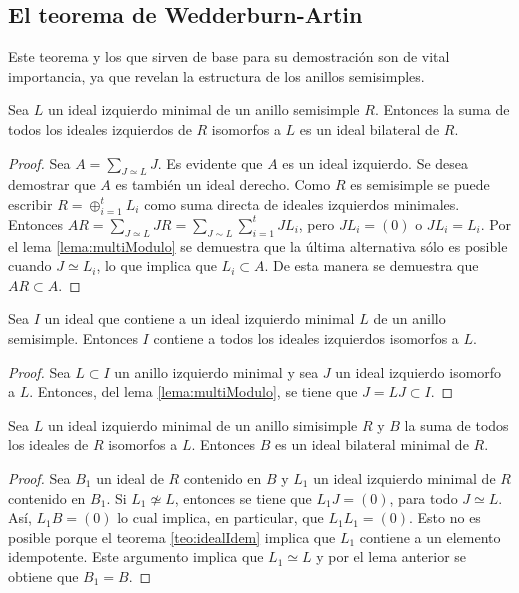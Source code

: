 \subsection{El teorema de Wedderburn-Artin}
Este teorema y los que sirven de base para su demostración son de vital importancia, ya que revelan la estructura de los anillos semisimples.
\begin{lema}
Sea $L$ un ideal izquierdo minimal de un anillo semisimple $R$. Entonces la suma de todos los ideales izquierdos de $R$ isomorfos a $L$ es un ideal bilateral de $R$.
\end{lema}
\begin{proof}
Sea $A = \sum_{J \simeq L}J$. Es evidente que $A$ es un ideal izquierdo. Se desea demostrar que $A$ es también un ideal derecho. Como $R$ es semisimple se puede escribir $R = \oplus_{i = 1}^tL_i$ como suma directa de ideales izquierdos minimales. Entonces $AR = \sum_{J \simeq L}JR = \sum_{J \sim L}\sum_{i=1}^{t}JL_i$, pero $JL_i = (0)$ o $JL_i = L_i$. Por el lema \ref{lema:multiModulo} se demuestra que la última alternativa sólo es posible cuando $J \simeq L_i$, lo que implica que $L_i \subset A$. De esta manera se demuestra que $AR \subset A$.
\end{proof}
\begin{lema}
Sea $I$ un ideal que contiene a un ideal izquierdo minimal $L$ de un anillo semisimple. Entonces $I$ contiene a todos los ideales izquierdos isomorfos a $L$.
\end{lema}
\begin{proof}
Sea $ L \subset I$ un anillo izquierdo minimal y sea $J$ un ideal izquierdo isomorfo a $L$. Entonces, del lema \ref{lema:multiModulo}, se tiene que $J = LJ \subset I$. 
\end{proof}
\begin{proposicion}
Sea $L$ un ideal izquierdo minimal de un anillo simisimple $R$ y $B$ la suma de todos los ideales de $R$ isomorfos a $L$. Entonces $B$ es un ideal bilateral minimal de $R$.
\end{proposicion}
\begin{proof}
Sea $B_1$ un ideal de $R$ contenido en $B$ y $L_1$ un ideal izquierdo minimal de $R$ contenido en $B_1$. Si $L_1 \not\simeq L$, entonces se tiene que $L_1J = (0)$, para todo $J \simeq L$. Así, $L_1B = (0)$ lo cual implica, en particular, que $L_1L_1 = (0)$. Esto no es posible porque el teorema \ref{teo:idealIdem}  implica que $L_1$ contiene a un elemento idempotente. Este argumento implica que $L_1 \simeq L$ y por el lema anterior se obtiene que $B_1 = B$. 
\end{proof}
